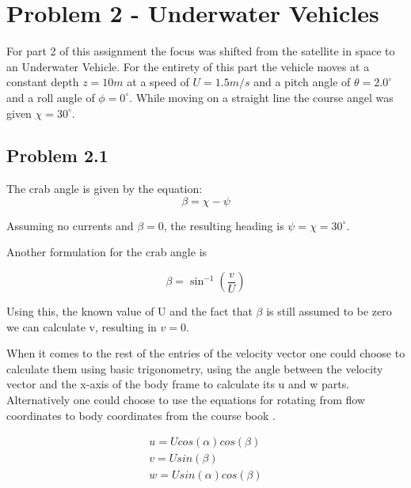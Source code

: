 \section*{Problem 2 - Underwater Vehicles}
For part 2 of this assignment the focus was shifted from the satellite in space to an Underwater Vehicle. For the entirety of this part the vehicle moves at a constant depth $z=10m$ at a speed of $U=1.5m/s$ and a pitch angle of $\theta = 2.0^\circ$ and a roll angle of $\phi = 0^\circ$. While moving on a straight line the course angel was given $\chi = 30^\circ$.
\subsection*{Problem 2.1}
The crab angle is given by the equation:
\begin{equation}
    \beta = \chi - \psi
\end{equation}

Assuming no currents and $\beta = 0$, the resulting heading is $\psi = \chi = 30^\circ$.

Another formulation for the crab angle is

\begin{equation}
    \beta = \sin^{-1}(\frac{v}{U})
    \label{eq:beta_2}
\end{equation}

Using this, the known value of U and the fact that $\beta$ is still assumed to be zero we can calculate v, resulting in $v=0$.

When it comes to the rest of the entries of the velocity vector one could choose to calculate them using basic trigonometry, using the angle between the velocity vector and the x-axis of the body frame to calculate its u and w parts. Alternatively one could choose to use the equations for rotating from flow coordinates to body coordinates from the course book \cite{Fossen2011}. 

\begin{subequations}
\label{eq:vel_vect_calc}
    \begin{align}
        u = U cos(\alpha)cos(\beta) \\
        v = U sin(\beta) \\
        w = U sin(\alpha)cos(\beta)
    \end{align}
\end{subequations}

